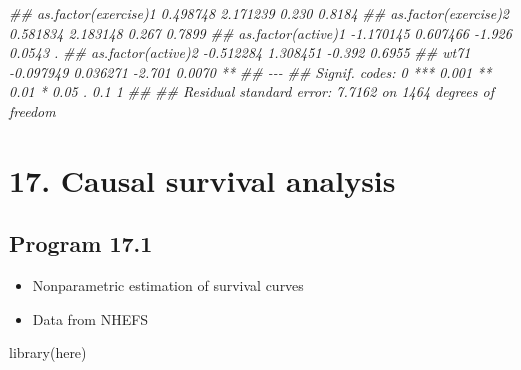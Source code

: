 \documentclass[
  10pt,
  a4paper,
]{book}
\newenvironment{Shaded}{\begin{snugshade}}{\end{snugshade}}
\newcommand{\DocumentationTok}[1]{\textcolor[rgb]{0.37,0.37,0.37}{\textit{#1}}}
\newcommand{\FunctionTok}[1]{\textcolor[rgb]{0.28,0.35,0.67}{#1}}
\newcommand{\NormalTok}[1]{\textcolor[rgb]{0.00,0.46,0.62}{#1}}
\providecommand{\tightlist}{%
  \setlength{\itemsep}{0pt}\setlength{\parskip}{0pt}}
\begin{document}
\begin{Shaded}
\begin{Highlighting}[]
\DocumentationTok{\#\# as.factor(exercise)1  0.498748   2.171239   0.230   0.8184    }
\DocumentationTok{\#\# as.factor(exercise)2  0.581834   2.183148   0.267   0.7899    }
\DocumentationTok{\#\# as.factor(active)1   {-}1.170145   0.607466  {-}1.926   0.0543 .  }
\DocumentationTok{\#\# as.factor(active)2   {-}0.512284   1.308451  {-}0.392   0.6955    }
\DocumentationTok{\#\# wt71                 {-}0.097949   0.036271  {-}2.701   0.0070 ** }
\DocumentationTok{\#\# {-}{-}{-}}
\DocumentationTok{\#\# Signif. codes:  0 \textquotesingle{}***\textquotesingle{} 0.001 \textquotesingle{}**\textquotesingle{} 0.01 \textquotesingle{}*\textquotesingle{} 0.05 \textquotesingle{}.\textquotesingle{} 0.1 \textquotesingle{} \textquotesingle{} 1}
\DocumentationTok{\#\# }
\DocumentationTok{\#\# Residual standard error: 7.7162 on 1464 degrees of freedom}
\end{Highlighting}
\end{Shaded}

\chapter*{17. Causal survival analysis}\label{causal-survival-analysis}

\section{Program 17.1}\label{program-17.1}

\begin{itemize}
\tightlist
\item
  Nonparametric estimation of survival curves
\item
  Data from NHEFS
\end{itemize}

\begin{Shaded}
\begin{Highlighting}[]
\FunctionTok{library}\NormalTok{(here)}
\end{Highlighting}
\end{Shaded}
\end{document}
